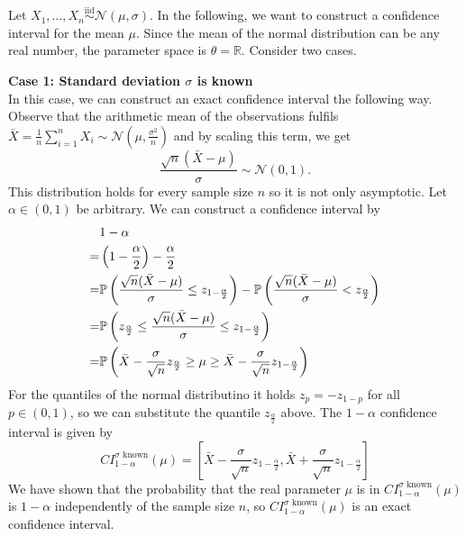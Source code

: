 \begin{example}
	Let $X_1, \ldots , X_n \overset{\text{iid}}{\sim} \mathcal N (\mu, \sigma)$. In the following, we want to construct a confidence interval for the mean $\mu$. Since the mean of the normal distribution can be any real number, the parameter space is $\theta = \mathbb R$. Consider two cases.
	
	
	\textbf{Case 1: Standard deviation $\sigma$ is known} \\
	In this case, we can construct an exact confidence interval the following way.
	Observe that the arithmetic mean of the observations fulfils $\bar X = \frac{1}{n} \sum_{i=1}^n X_i \sim \mathcal N \left( \mu, \frac{\sigma^2}{n} \right)$ and by scaling this term, we get
	\[
		\frac{\sqrt{n}(\bar X - \mu)}{\sigma} \sim \mathcal N (0, 1).
	\]
	This distribution holds for every sample size $n$ so it is not only asymptotic. 
	Let $\alpha \in (0, 1)$ be arbitrary. We can construct a confidence interval by 
	\begin{align}
		& 1 - \alpha \notag \\
		=&
		\left( 1 - \frac{\alpha}{2} \right) - \frac{\alpha}{2} \notag \\
		=&
		\mathbb{P} \left(  
		\frac{\sqrt{n}(\bar X - \mu)}{\sigma}
		\leq z_{1 - \frac{\alpha}{2}} \right)
		-
		\mathbb{P} \left( 
		\frac{\sqrt{n}(\bar X - \mu)}{\sigma}
		< z_{\frac{\alpha}{2}} \right) \notag \\
		=&
		\mathbb{P} \left( z_{\frac{\alpha}{2}} \leq 
		\frac{\sqrt{n}(\bar X - \mu)}{\sigma}
		\leq z_{1 - \frac{\alpha}{2}} \right) \notag \\
		=&
		\mathbb{P} 
		\left( 
		\bar X - \frac{\sigma}{\sqrt{n}} z_{\frac{\alpha}{2}} \geq  \mu \geq \bar X - \frac{\sigma}{\sqrt{n}} z_{1 - \frac{\alpha}{2}}		
		\right)
	\end{align}
	For the quantiles of the normal distributino it holds $z_p = - z_{1-p}$ for all $p \in (0, 1)$, so we can substitute the quantile $z_{\frac{\alpha}{2}}$ above. The $1- \alpha$ confidence interval is given by
	\[
		CI_{1 - \alpha}^{\sigma \text{ known}} (\mu) 
		=
		\left[ 
		\bar X - \frac{\sigma}{\sqrt{n}} z_{1 - \frac{\alpha}{2}}
		,
		\bar X + \frac{\sigma}{\sqrt{n}} z_{1 - \frac{\alpha}{2}}
		\right]
	\]
	We have shown that the probability that the real parameter $\mu$ is in $CI_{1 - \alpha}^{\sigma \text{ known}} (\mu)$ is $1 - \alpha$ independently of the sample size $n$, so $CI_{1 - \alpha}^{\sigma \text{ known}} (\mu)$ is an exact confidence interval. 
	

\end{example}
